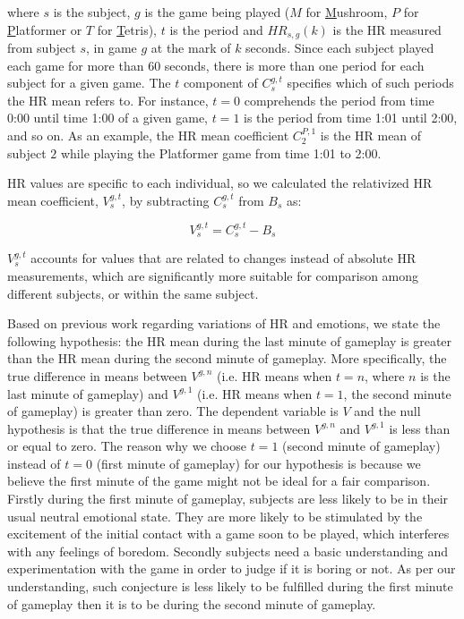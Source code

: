 where $s$ is the subject, $g$ is the game being played ($M$ for \underline{M}ushroom, $P$ for \underline{P}latformer or $T$ for \underline{T}etris), $t$ is the period and $HR_{s,g}(k)$ is the HR measured from subject $s$, in game $g$ at the mark of $k$ seconds. Since each subject played each game for more than 60 seconds, there is more than one period for each subject for a given game. The $t$ component of $C_s^{g,t}$ specifies which of such periods the HR mean refers to. For instance, $t=0$ comprehends the period from time 0:00 until time 1:00 of a given game, $t=1$ is the period from time 1:01 until 2:00, and so on. As an example, the HR mean coefficient $C_2^{P,1}$ is the HR mean of subject $2$ while playing the Platformer game from time 1:01 to 2:00.

HR values are specific to each individual, so we calculated the relativized HR mean coefficient, $V_s^{g,t}$, by subtracting $C_s^{g,t}$ from $B_s$ as:

\begin{equation} \label{eq:variation-normalized}
V_s^{g,t} = C_s^{g,t} - B_s
\end{equation}

$V_s^{g,t}$ accounts for values that are related to changes instead of absolute HR measurements, which are significantly more suitable for comparison among different subjects, or within the same subject.

Based on previous work regarding variations of HR and emotions, we state the following hypothesis: the HR mean during the last minute of gameplay is greater than the HR mean during the second minute of gameplay. More specifically, the true difference in means between $V^{g,n}$ (i.e. HR means when $t=n$, where $n$ is the last minute of gameplay) and $V^{g,1}$ (i.e. HR means when $t=1$, the second minute of gameplay) is greater than zero. The dependent variable is $V$ and the null hypothesis is that the true difference in means between $V^{g,n}$ and $V^{g,1}$ is less than or equal to zero. The reason why we choose $t=1$ (second minute of gameplay) instead of $t=0$ (first minute of gameplay) for our hypothesis is because we believe the first minute of the game might not be ideal for a fair comparison. Firstly during the first minute of gameplay, subjects are less likely to be in their usual neutral emotional state. They are more likely to be stimulated by the excitement of the initial contact with a game soon to be played, which interferes with any feelings of boredom. Secondly subjects need a basic understanding and experimentation with the game in order to judge if it is boring or not. As per our understanding, such conjecture is less likely to be fulfilled during the first minute of gameplay then it is to be during the second minute of gameplay.

